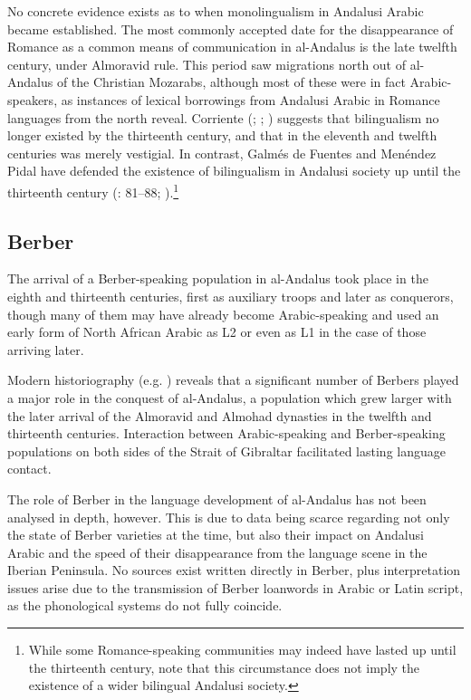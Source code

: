 \documentclass[output=paper,modfonts,nonflat]{langsci/langscibook}
\begin{document}
No concrete evidence exists as to when monolingualism in Andalusi Arabic became established. The most commonly accepted date for the disappearance of Romance as a common means of communication in al-Andalus is the late twelfth century, under Almoravid rule. This period saw migrations north out of al-Andalus of the Christian Mozarabs, although most of these were in fact Arabic-speakers, as instances of lexical borrowings from Andalusi Arabic in Romance languages from the north reveal. Corriente (\citeyear{Corriente1997dictionary}; \citeyear[443]{Corriente1992book}; \citeyear{Corriente2005}) suggests that bilingualism no longer existed by the thirteenth century, and that in the eleventh and twelfth centuries was merely vestigial. In contrast, Galmés de Fuentes and Menéndez Pidal have defended the existence of bilingualism in Andalusi society up until the thirteenth century (\citealt{GalmésdeFuentes1994}: 81–88; \citealt{MenéndezPidalGalmésdeFuentes2001}).\footnote{While some Romance-speaking communities may indeed have lasted up until the thirteenth century, note that this circumstance does not imply the existence of a wider bilingual Andalusi society.} 

\subsection{Berber}

The arrival of a Berber-speaking population in al-Andalus took place in the eighth and thirteenth centuries, first as auxiliary troops and later as conquerors, though many of them may have already become Arabic-speaking and used an early form of North African Arabic as L2 or even as L1 in the case of those arriving later. 

Modern historiography (e.g. \citealt{ManzanoMoreno1990,Guichard1995,Chalmeta2003}) reveals that a significant number of Berbers played a major role in the conquest of al-Andalus, a population which grew larger with the later arrival of the Almoravid and Almohad dynasties in the twelfth and thirteenth centuries. Interaction between Arabic-speaking and Berber-speaking populations on both sides of the Strait of Gibraltar facilitated lasting language contact. 

The role of Berber in the language development of al-Andalus has not been analysed in depth, however. This is due to data being scarce regarding not only the state of Berber varieties at the time, but also their impact on Andalusi Arabic and the speed of their disappearance from the language scene in the Iberian Peninsula. No sources exist written directly in Berber, plus interpretation issues arise due to the transmission of Berber loanwords in Arabic or Latin script, as the phonological systems do not fully coincide.  
\end{document}
